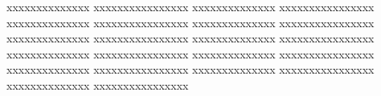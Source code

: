 \begin{resumo} 
  xxxxxxxxxxxxxx xxxxxxxxxxxxxxxx  xxxxxxxxxxxxxx xxxxxxxxxxxxxxxx
  xxxxxxxxxxxxxx xxxxxxxxxxxxxxxx  xxxxxxxxxxxxxx xxxxxxxxxxxxxxxx
  xxxxxxxxxxxxxx xxxxxxxxxxxxxxxx  xxxxxxxxxxxxxx xxxxxxxxxxxxxxxx
  xxxxxxxxxxxxxx xxxxxxxxxxxxxxxx  xxxxxxxxxxxxxx xxxxxxxxxxxxxxxx
  xxxxxxxxxxxxxx xxxxxxxxxxxxxxxx  xxxxxxxxxxxxxx xxxxxxxxxxxxxxxx
  xxxxxxxxxxxxxx xxxxxxxxxxxxxxxx
\end{resumo} 
